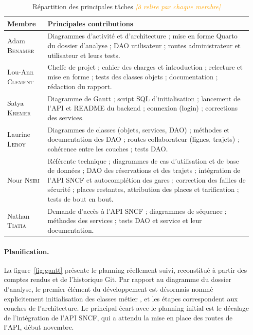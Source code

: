\documentclass[11pt,a4paper]{article}
\newcommand{\acompleter}[1]{\textcolor{orange}{\textit{[#1]}}}
\begin{document}
\begin{table}[H]
\centering\small
\begin{tabularx}{\textwidth}{@{}l Y@{}}
\toprule
\textbf{Membre} & \textbf{Principales contributions} \\
\midrule
Adam \textsc{Benamer}     & Diagrammes d'activité et d'architecture ; mise en forme Quarto du dossier
                            d'analyse ; DAO utilisateur ; routes administrateur et utilisateur et
                            leurs tests. \\
Lou-Ann \textsc{Clement}  & Cheffe de projet ; cahier des charges et introduction ; relecture et mise
                            en forme ; tests des classes objets ; documentation ; rédaction du
                            rapport. \\
Satya \textsc{Kremer}     & Diagramme de Gantt ; script SQL d'initialisation ; lancement de l'API et
                            README du backend ; connexion (login) ; corrections des services. \\
Laurine \textsc{Leroy}    & Diagrammes de classes (objets, services, DAO) ; méthodes et documentation
                            des DAO ; routes collaborateur (lignes, trajets) ; cohérence entre les
                            couches ; tests DAO. \\
Nour \textsc{Nsiri}       & Référente technique ; diagrammes de cas d'utilisation et de base de
                            données ; DAO des réservations et des trajets ; intégration de l'API
                            SNCF et autocomplétion des gares ; correction des failles de sécurité ;
                            places restantes, attribution des places et tarification ; tests de bout
                            en bout. \\
Nathan \textsc{Tiatia}    & Demande d'accès à l'API SNCF ; diagrammes de séquence ; méthodes des
                            services ; tests DAO et service et leur documentation. \\
\bottomrule
\end{tabularx}
\caption{Répartition des principales tâches \acompleter{à relire par chaque membre}}\label{tab:repartition}
\end{table}

\paragraph{Planification.}
La figure~\ref{fig:gantt} présente le planning réellement suivi, reconstitué à partir des comptes
rendus et de l'historique Git. Par rapport au diagramme du dossier d'analyse, le premier élément du
développement est désormais nommé explicitement \og initialisation des classes métier \fg, et les
étapes correspondent aux couches de l'architecture. Le principal écart avec le planning initial est
le décalage de l'intégration de l'API SNCF, qui a attendu la mise en place des routes de l'API,
début novembre.
\end{document}
